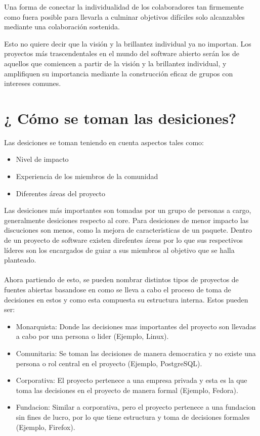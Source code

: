 Una forma de conectar la individualidad de los colaboradores tan firmemente como fuera posible para llevarla a culminar objetivos difíciles solo alcanzables mediante una colaboración sostenida. 

Esto no quiere decir que la visión y la brillantez individual ya no importan. Los proyectos más trascendentales en el mundo del software abierto serán los de aquellos que comiencen a partir de la visión y la brillantez individual, y amplifiquen su importancia mediante la construcción eficaz de grupos con intereses comunes. 


\section{¿ Cómo se toman las desiciones?}

Las desiciones se toman teniendo en cuenta aspectos tales como:
\begin{itemize}
     \item Nivel de impacto
     \item Experiencia de los miembros de la comunidad
     \item Diferentes áreas del proyecto
\end{itemize}

Las desiciones más importantes son tomadas por un grupo de personas a cargo, generalmente desiciones respecto al core. Para desiciones de menor impacto las discuciones son menos, como la mejora de caracteristicas de un paquete.
Dentro de un proyecto de software existen direfentes áreas por lo que sus respectivos líderes son los encargados de guiar a sus miembros al objetivo que se halla planteado.
\\
\\
Ahora partiendo de esto, se pueden nombrar distintos tipos de proyectos de fuentes abiertas basandose en como se lleva a cabo el proceso de toma de decisiones en estos y como esta compuesta su estructura interna. Estos pueden ser:
\begin{itemize}
    \item Monarquista: Donde las decisiones mas importantes del proyecto son llevadas a cabo por una persona o lider (Ejemplo, Linux).
    \item Comunitaria: Se toman las decisiones de manera democratica y no existe una persona o rol central en el proyecto (Ejemplo, PostgreSQL).
    \item Corporativa: El proyecto pertenece a una empresa privada y esta es la que toma las decisiones en el proyecto de manera formal (Ejemplo, Fedora).
    \item Fundacion: Similar a corporativa, pero el proyecto pertenece a una fundacion sin fines de lucro, por lo que tiene estructura y toma de decisiones formales (Ejemplo, Firefox).
\end{itemize}

